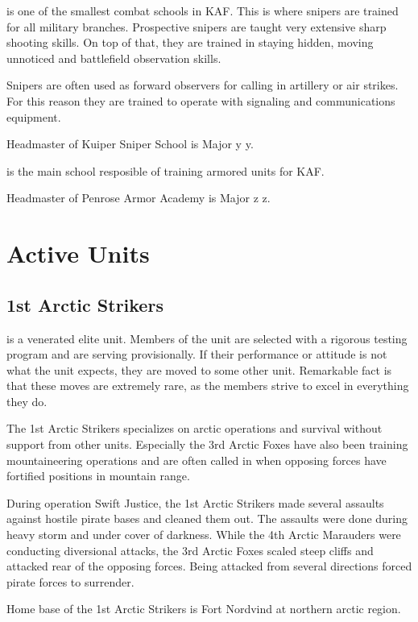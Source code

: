 \documentclass{tufte-book}
\begin{document}
 is one of the smallest combat schools in KAF.
This is where snipers are trained for all military branches. Prospective
snipers are taught very extensive sharp shooting skills. On top of that, they
are trained in staying hidden, moving unnoticed and battlefield observation
skills.

Snipers are often used as forward observers for calling in artillery or air
strikes. For this reason they are trained to operate with signaling and
communications equipment.

Headmaster of Kuiper Sniper School is Major y y.

 is the main school resposible of training
armored units for KAF.

Headmaster of Penrose Armor Academy is Major z z.

\chapter{Active Units}
\label{ch:active_units}

\section{1st Arctic Strikers}
\label{sc:arctic_strikers}

 is a venerated elite unit. Members of the unit
are selected with a rigorous testing program and are serving provisionally.
If their performance or attitude is not what the unit expects, they are moved
to some other unit. Remarkable fact is that these moves are extremely rare,
as the members strive to excel in everything they do.

The 1st Arctic Strikers specializes on arctic operations and survival without
support from other units. Especially the 3rd Arctic Foxes have also been
training mountaineering operations and are often called in when opposing
forces have fortified positions in mountain range.

During operation Swift Justice, the 1st Arctic Strikers made several assaults
against hostile pirate bases and cleaned them out. The assaults were done
during heavy storm and under cover of darkness. While the 4th Arctic Marauders
were conducting diversional attacks, the 3rd Arctic Foxes scaled steep cliffs
and attacked rear of the opposing forces. Being attacked from several
directions forced pirate forces to surrender.

Home base of the 1st Arctic Strikers is Fort Nordvind at northern arctic
region.
\end{document}
